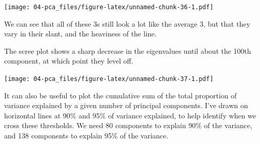 \documentclass[]{book}
\newenvironment{Shaded}{\begin{snugshade}}{\end{snugshade}}
\newcommand{\CommentTok}[1]{\textcolor[rgb]{0.56,0.35,0.01}{\textit{#1}}}
\newcommand{\DataTypeTok}[1]{\textcolor[rgb]{0.13,0.29,0.53}{#1}}
\newcommand{\DecValTok}[1]{\textcolor[rgb]{0.00,0.00,0.81}{#1}}
\newcommand{\KeywordTok}[1]{\textcolor[rgb]{0.13,0.29,0.53}{\textbf{#1}}}
\newcommand{\NormalTok}[1]{#1}
\newcommand{\OperatorTok}[1]{\textcolor[rgb]{0.81,0.36,0.00}{\textbf{#1}}}
\newcommand{\StringTok}[1]{\textcolor[rgb]{0.31,0.60,0.02}{#1}}
\theoremstyle{definition}
\theoremstyle{definition}
\theoremstyle{definition}
\theoremstyle{remark}
\begin{document}
\texttt{[image: 04-pca\_files/figure-latex/unnamed-chunk-36-1.pdf]}

We can see that all of these 3s still look a lot like the average 3, but that they vary in their slant, and the heaviness of the line.

The scree plot shows a sharp decrease in the eigenvalues until about the 100th component, at which point they level off.

\begin{Shaded}
\end{Shaded}

\texttt{[image: 04-pca\_files/figure-latex/unnamed-chunk-37-1.pdf]}

It can also be useful to plot the cumulative sum of the total proportion of variance explained by a given number of principal components. I've drawn on horizontal lines at 90\% and 95\% of variance explained, to help identify when we cross these thresholds.
We need 80 components to explain 90\% of the variance, and 138 components to explain 95\% of the variance.

\begin{Shaded}
\end{Shaded}
\end{document}
